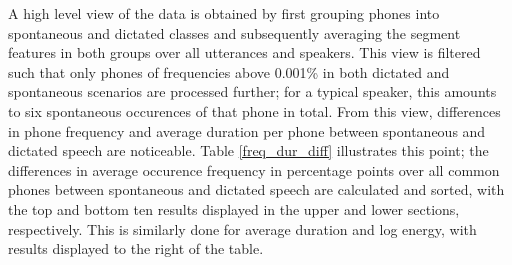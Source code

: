 \documentclass[conference]{IEEEtran}
\begin{document}
A high level view of the data is obtained by first grouping phones into spontaneous and dictated classes and subsequently averaging the segment features in both groups over all utterances and speakers.
This view is filtered such that only phones of frequencies above 0.001\% in both dictated and spontaneous scenarios are processed further; for a typical speaker, this amounts to six spontaneous occurences of that phone in total.
From this view, differences in phone frequency and average duration per phone between spontaneous and dictated speech are noticeable.
Table \ref{freq_dur_diff} illustrates this point; the differences in average occurence frequency in percentage points over all common phones between spontaneous and dictated speech are calculated and sorted, with the top and bottom ten results displayed in the upper and lower sections, respectively.
This is similarly done for average duration and log energy, with results displayed to the right of the table.
\end{document}
